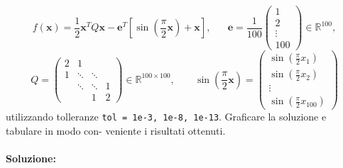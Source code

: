 \documentclass[12pt]{article}
\begin{document}
\begin{equation*} 
    f(\boldsymbol{x})=\frac{1}{2}\boldsymbol{x}^TQ\boldsymbol{x}-\boldsymbol{e}^T\left[ \sin(\frac{\pi}{2}\boldsymbol{x})+\boldsymbol{x}\right],\;\;\;\;\;\;
    \boldsymbol{e}=\frac{1}{100}
    \begin{pmatrix}
        1\\
        2\\
        \vdots \\
        100
    \end{pmatrix}
    \in \mathbb{R}^{100},
\end{equation*}
\begin{equation*}
    Q=
    \begin{pmatrix}
        2 & 1 &  & \\
        1 & \ddots &\ddots& \\
        &\ddots &\ddots &1 \\
        & &  1&2
    \end{pmatrix}
    \in \mathbb{R}^{100\times 100}, \;\;\;\;\;\;\;\sin(\frac{\pi}{2}\boldsymbol{x}) =
    \begin{pmatrix}
        \sin(\frac{\pi}{2}x_1)\\
        \sin(\frac{\pi}{2}x_2)\\
        \vdots \\
        \sin(\frac{\pi}{2}x_{100})
    \end{pmatrix}
\end{equation*}
utilizzando tolleranze \texttt{tol = 1e-3, 1e-8, 1e-13}. Graficare la soluzione e tabulare in modo con- veniente i risultati ottenuti.
\paragraph{Soluzione:}
\end{document}

